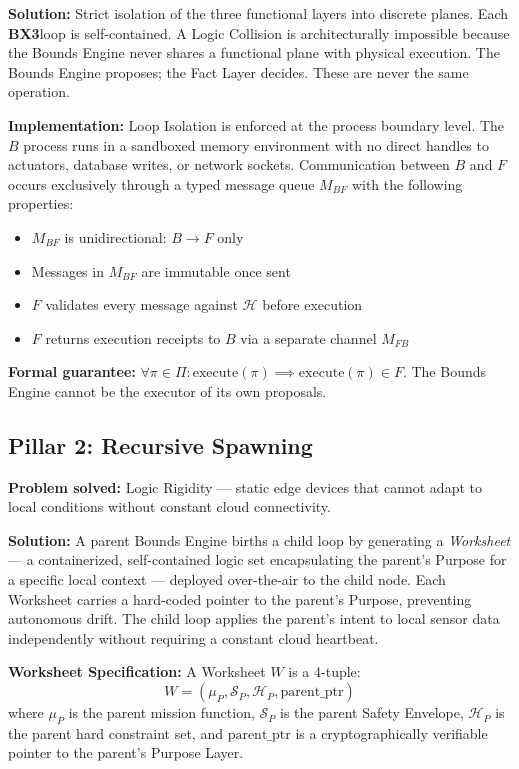 \documentclass[12pt]{article}
\newcommand{\bxthree}{\textbf{BX3}}
\begin{document}
\textbf{Solution:} Strict isolation of the three functional layers into discrete planes. Each \bxthree loop is self-contained. A Logic Collision is architecturally impossible because the Bounds Engine never shares a functional plane with physical execution. The Bounds Engine proposes; the Fact Layer decides. These are never the same operation.

\textbf{Implementation:} Loop Isolation is enforced at the process boundary level. The $B$ process runs in a sandboxed memory environment with no direct handles to actuators, database writes, or network sockets. Communication between $B$ and $F$ occurs exclusively through a typed message queue $M_{BF}$ with the following properties:

\begin{itemize}
\item $M_{BF}$ is unidirectional: $B \rightarrow F$ only
\item Messages in $M_{BF}$ are immutable once sent
\item $F$ validates every message against $\mathcal{H}$ before execution
\item $F$ returns execution receipts to $B$ via a separate channel $M_{FB}$
\end{itemize}

\textbf{Formal guarantee:} $\forall \pi \in \Pi: \text{execute}(\pi) \implies \text{execute}(\pi) \in F$. The Bounds Engine cannot be the executor of its own proposals.

\subsection{Pillar 2: Recursive Spawning}
\textbf{Problem solved:} Logic Rigidity --- static edge devices that cannot adapt to local conditions without constant cloud connectivity.

\textbf{Solution:} A parent Bounds Engine births a child loop by generating a \textit{Worksheet} --- a containerized, self-contained logic set encapsulating the parent's Purpose for a specific local context --- deployed over-the-air to the child node. Each Worksheet carries a hard-coded pointer to the parent's Purpose, preventing autonomous drift. The child loop applies the parent's intent to local sensor data independently without requiring a constant cloud heartbeat.

\textbf{Worksheet Specification:} A Worksheet $W$ is a 4-tuple:
\begin{equation}
W = (\mu_P, \mathcal{S}_P, \mathcal{H}_P, \text{parent\_ptr})
\end{equation}
where $\mu_P$ is the parent mission function, $\mathcal{S}_P$ is the parent Safety Envelope, $\mathcal{H}_P$ is the parent hard constraint set, and $\text{parent\_ptr}$ is a cryptographically verifiable pointer to the parent's Purpose Layer.
\end{document}
